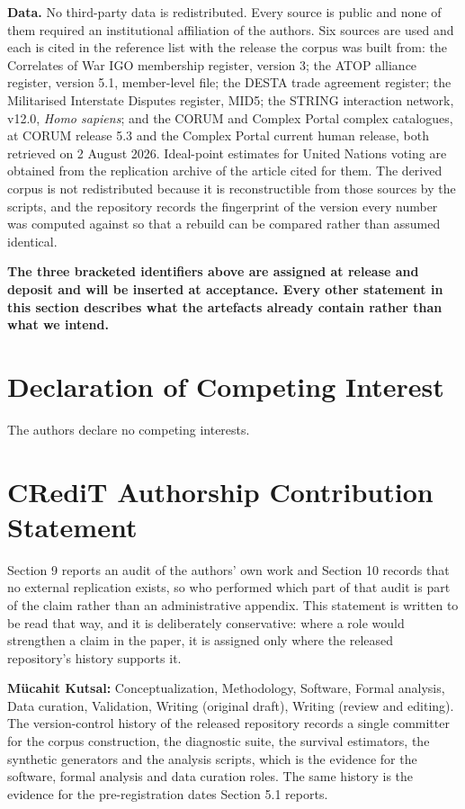 \documentclass[twoside,11pt]{article}
\begin{document}
\textbf{Data.} No third-party data is redistributed. Every source is public and none of them required an institutional affiliation of the authors. Six sources are used and each is cited in the reference list with the release the corpus was built from: the Correlates of War IGO membership register, version 3; the ATOP alliance register, version 5.1, member-level file; the DESTA trade agreement register; the Militarised Interstate Disputes register, MID5; the STRING interaction network, v12.0, \emph{Homo sapiens}; and the CORUM and Complex Portal complex catalogues, at CORUM release 5.3 and the Complex Portal current human release, both retrieved on 2 August 2026. Ideal-point estimates for United Nations voting are obtained from the replication archive of the article cited for them. The derived corpus is not redistributed because it is reconstructible from those sources by the scripts, and the repository records the fingerprint of the version every number was computed against so that a rebuild can be compared rather than assumed identical.

\textbf{The three bracketed identifiers above are assigned at release and deposit and will be inserted at acceptance. Every other statement in this section describes what the artefacts already contain rather than what we intend.}

\section{Declaration of Competing Interest}

The authors declare no competing interests.

\section{CRediT Authorship Contribution Statement}

Section 9 reports an audit of the authors' own work and Section 10 records that no external replication exists, so who performed which part of that audit is part of the claim rather than an administrative appendix. This statement is written to be read that way, and it is deliberately conservative: where a role would strengthen a claim in the paper, it is assigned only where the released repository's history supports it.

\textbf{M\"ucahit Kutsal:} Conceptualization, Methodology, Software, Formal analysis, Data curation, Validation, Writing (original draft), Writing (review and editing). The version-control history of the released repository records a single committer for the corpus construction, the diagnostic suite, the survival estimators, the synthetic generators and the analysis scripts, which is the evidence for the software, formal analysis and data curation roles. The same history is the evidence for the pre-registration dates Section 5.1 reports.
\end{document}
